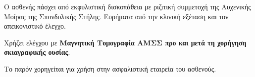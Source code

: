 \documentclass[10pt,greek]{article}
\begin{document}
\begin{PatientInfo}
\end{PatientInfo}

Ο ασθενής πάσχει από εκφυλιστική δισκοπάθεια με ριζιτική συμμετοχή της Αυχενικής Μοίρας της Σπονδυλικής Στήλης.
Ευρήματα από την κλινική εξέταση και τον απεικονιστικό έλεγχο.

Χρήζει ελέγχου με \textbf{Μαγνητική Τομογραφία ΑΜΣΣ προ και μετά τη χορήγηση σκιαγραφικής ουσίας}.

Το παρόν χορηγείται για χρήση στην ασφαλιστική εταιρεία του ασθενούς.
\end{document}
